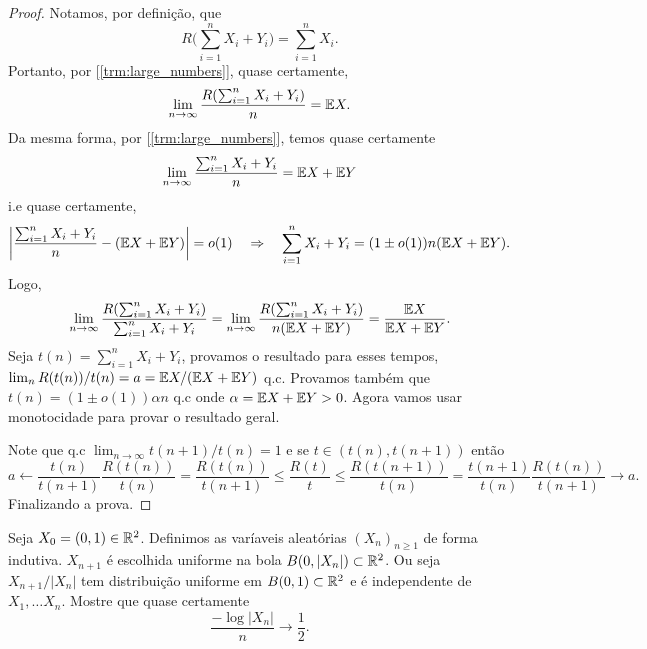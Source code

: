 \begin{proof}
	Notamos, por definição, que
	\[
		R\bigg( \sum_{i = 1}^n X_i + Y_i\bigg) = \sum_{i = 1}^n X_i.
	\]
	Portanto, por [\ref{trm:large_numbers}], quase certamente,
	\[
		\lim_{n\rightarrow\infty} \frac{R (\sum_{i = 1}^n X_i + Y_i)}{n} = \mathbb{E} X.
	\]
	Da mesma forma, por [\ref{trm:large_numbers}], temos quase certamente
	\[
		\lim_{n \rightarrow \infty} \frac{\sum_{i=1}^n X_i + Y_i}{n} = \mathbb{E} X + \mathbb{E} Y
	\]
	i.e quase certamente,
	\[
		\bigg|\frac{\sum_{i=1}^n X_i + Y_i}{n} - (\mathbb{E} X + \mathbb{E} Y) \bigg| =
		o(1) \quad \Rightarrow \quad \sum_{i = 1}^n X_i + Y_i = (1 \pm
		o(1))n(\mathbb{E} X + \mathbb{E} Y).
	\]
	Logo,
	\[
		\lim_{n\rightarrow\infty} \frac{R (\sum_{i = 1}^n X_i + Y_i)}{\sum_{i =
		1}^n X_i + Y_i} = \lim_{n\rightarrow\infty} \frac{R (\sum_{i = 1}^n X_i +
		Y_i)}{n(\mathbb{E} X + \mathbb{E} Y)} = \frac{\mathbb{E} X}{\mathbb{E} X + \mathbb{E} Y}.
	\]
	Seja $t(n) = \sum_{i = 1}^n X_i + Y_i$, provamos o resultado para
	esses tempos, $\lim_{n} R(t(n))/t(n) = a = \mathbb{E} X/(\mathbb{E} X+ \mathbb{E} Y)$ q.c.
 Provamos também que
	$t(n) = (1 \pm o(1))\alpha n$ q.c onde $\alpha = \mathbb{E} X + \mathbb{E} Y > 0$.
	Agora vamos usar monotocidade para provar o resultado geral.

	Note que q.c $\lim_{n\to \infty} t(n+1)/t(n) = 1$ e se $t \in (t(n),
	t(n+1))$ então
	\[
		a \leftarrow \frac{t(n)}{t(n+1)}\frac{R(t(n))}{t(n)} =
		\frac{R(t(n))}{t(n+1)} \leq \frac{R(t)}{t} \leq
		\frac{R(t(n+1))}{t(n)} = \frac{t(n+1)}{t(n)}\frac{R(t(n))}{t(n+1)}
		\rightarrow a.
	\]
	Finalizando a prova.
\end{proof}

\begin{exercise}
	Seja $X_0 = (0,1) \in \mathbb{R}^2$. Definimos as varíaveis aleatórias
	$(X_n)_{n\geq1}$ de forma indutiva. $X_{n+1}$ é escolhida uniforme
	na bola $B(0,|X_n|) \subset \mathbb{R}^2$.
	Ou seja $X_{n+1}/|X_n|$ tem distribuição uniforme em $B(0,1) \subset
	\mathbb{R}^2$ e é independente de $X_1, \dots X_n$. Mostre que quase certamente
	\[
		\frac{-\log|X_n|}{n} \to \frac{1}{2}.
	\]
\end{exercise}

